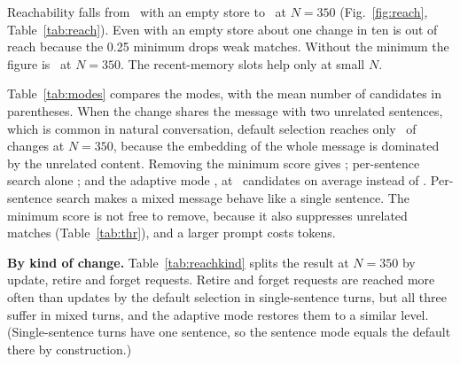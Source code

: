 \IfFileExists{IEEEtran.cls}{\documentclass[journal]{IEEEtran}\def\HAVEIEEE{1}}{\documentclass[10pt,twocolumn]{article}\usepackage[margin=0.7in,columnsep=0.25in]{geometry}}
\begin{document}
\begin{table}[t]
\centering\small
\caption{Reachability for single-sentence changes (95\% Wilson interval).}
\label{tab:reach}
\end{table}

Reachability falls from \reachZero\ with an empty store to \reachLast\ at $N=350$ (Fig.~\ref{fig:reach}, Table~\ref{tab:reach}). Even with an empty store about one change in ten is out of reach because the 0.25 minimum drops weak matches. Without the minimum the figure is \reachLastNoMin\ at $N=350$. The recent-memory slots help only at small $N$.

Table~\ref{tab:modes} compares the modes, with the mean number of candidates in parentheses. When the change shares the message with two unrelated sentences, which is common in natural conversation, default selection reaches only \mixedDefault\ of changes at $N=350$, because the embedding of the whole message is dominated by the unrelated content. Removing the minimum score gives \mixedNomin; per-sentence search alone \mixedSentence; and the adaptive mode \mixedAdaptive, at \candAdaptive\ candidates on average instead of \candDefault. Per-sentence search makes a mixed message behave like a single sentence. The minimum score is not free to remove, because it also suppresses unrelated matches (Table~\ref{tab:thr}), and a larger prompt costs tokens.

\begin{table}[t]
\centering\small
\caption{Reachability by selection mode (mean number of candidates in parentheses).}
\label{tab:modes}
\end{table}

\textbf{By kind of change.} Table~\ref{tab:reachkind} splits the result at $N=350$ by update, retire and forget requests. Retire and forget requests are reached more often than updates by the default selection in single-sentence turns, but all three suffer in mixed turns, and the adaptive mode restores them to a similar level. (Single-sentence turns have one sentence, so the sentence mode equals the default there by construction.)

\begin{table}[t]
\centering\small
\caption{Reachability by kind of change at $N=350$.}
\label{tab:reachkind}
\end{table}
\end{document}
